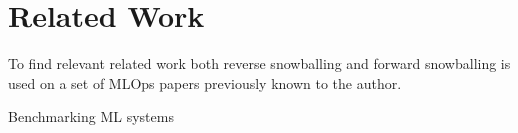 \chapter{Related Work}

To find relevant related work both reverse snowballing and forward snowballing is used on a set of MLOps papers previously known to the author.

Benchmarking ML systems \parencite{cardososilvaBenchmarkingMachineLearning2020}